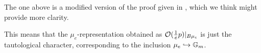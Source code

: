 \begin{rmk}
The one above is a modified version of the proof given in \cite[]{Taams}, which we think might provide more clarity.
\end{rmk}

This means that the $\mu_e$-representation obtained as $\mathcal{O}(\frac{1}{e}p)\vert_{B\mu_e}$ is just the tautological character, corresponding to the inclusion $\mu_e \hookrightarrow \mathbb{G}_m$.